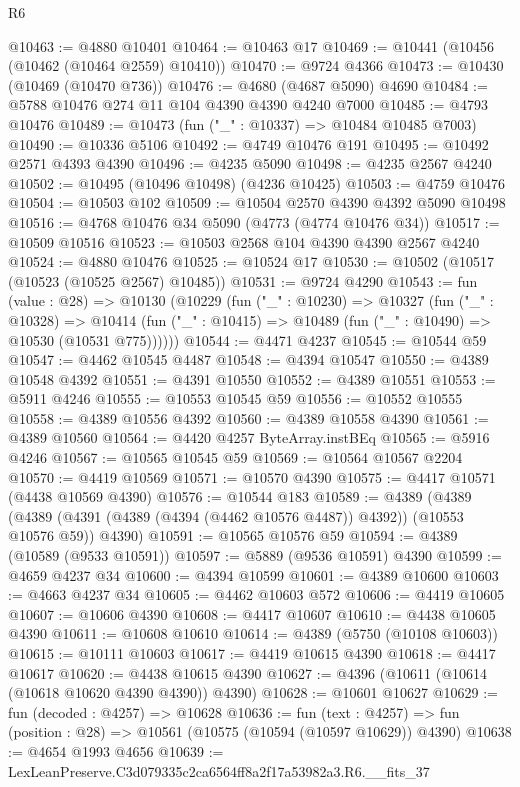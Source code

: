 \begin{lexlean}{R6}
\begin{coremodule}
@10463 := @4880 @10401
@10464 := @10463 @17
@10469 := @10441 (@10456 (@10462 (@10464 @2559) @10410))
@10470 := @9724 @4366
@10473 := @10430 (@10469 (@10470 @736))
@10476 := @4680 (@4687 @5090) @4690
@10484 := @5788 @10476 @274 @11 @104 @4390 @4390 @4240 @7000
@10485 := @4793 @10476
@10489 := @10473 (fun ("_" : @10337) => @10484 @10485 @7003)
@10490 := @10336 @5106
@10492 := @4749 @10476 @191
@10495 := @10492 @2571 @4393 @4390
@10496 := @4235 @5090
@10498 := @4235 @2567 @4240
@10502 := @10495 (@10496 @10498) (@4236 @10425)
@10503 := @4759 @10476
@10504 := @10503 @102
@10509 := @10504 @2570 @4390 @4392 @5090 @10498
@10516 := @4768 @10476 @34 @5090 (@4773 (@4774 @10476 @34))
@10517 := @10509 @10516
@10523 := @10503 @2568 @104 @4390 @4390 @2567 @4240
@10524 := @4880 @10476
@10525 := @10524 @17
@10530 := @10502 (@10517 (@10523 (@10525 @2567) @10485))
@10531 := @9724 @4290
@10543 := fun (value : @28) =>
  @10130
    (@10229
      (fun ("_" : @10230) =>
      @10327
        (fun ("_" : @10328) =>
        @10414 (fun ("_" : @10415) => @10489 (fun ("_" : @10490) => @10530 (@10531 @775))))))
@10544 := @4471 @4237
@10545 := @10544 @59
@10547 := @4462 @10545 @4487
@10548 := @4394 @10547
@10550 := @4389 @10548 @4392
@10551 := @4391 @10550
@10552 := @4389 @10551
@10553 := @5911 @4246
@10555 := @10553 @10545 @59
@10556 := @10552 @10555
@10558 := @4389 @10556 @4392
@10560 := @4389 @10558 @4390
@10561 := @4389 @10560
@10564 := @4420 @4257 ByteArray.instBEq
@10565 := @5916 @4246
@10567 := @10565 @10545 @59
@10569 := @10564 @10567 @2204
@10570 := @4419 @10569
@10571 := @10570 @4390
@10575 := @4417 @10571 (@4438 @10569 @4390)
@10576 := @10544 @183
@10589 := @4389
    (@4389 (@4389 (@4391 (@4389 (@4394 (@4462 @10576 @4487)) @4392)) (@10553 @10576 @59)) @4390)
@10591 := @10565 @10576 @59
@10594 := @4389 (@10589 (@9533 @10591))
@10597 := @5889 (@9536 @10591) @4390
@10599 := @4659 @4237 @34
@10600 := @4394 @10599
@10601 := @4389 @10600
@10603 := @4663 @4237 @34
@10605 := @4462 @10603 @572
@10606 := @4419 @10605
@10607 := @10606 @4390
@10608 := @4417 @10607
@10610 := @4438 @10605 @4390
@10611 := @10608 @10610
@10614 := @4389 (@5750 (@10108 @10603))
@10615 := @10111 @10603
@10617 := @4419 @10615 @4390
@10618 := @4417 @10617
@10620 := @4438 @10615 @4390
@10627 := @4396 (@10611 (@10614 (@10618 @10620 @4390 @4390)) @4390)
@10628 := @10601 @10627
@10629 := fun (decoded : @4257) => @10628
@10636 := fun (text : @4257) =>
  fun (position : @28) => @10561 (@10575 (@10594 (@10597 @10629)) @4390)
@10638 := @4654 @1993 @4656
@10639 := LexLeanPreserve.C3d079335c2ca6564ff8a2f17a53982a3.R6.__fits_37

\end{coremodule}
\end{lexlean}
